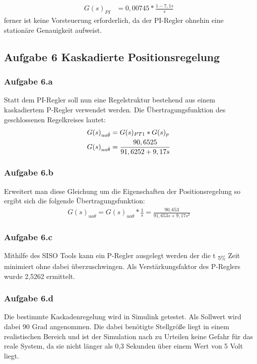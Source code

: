 \documentclass[10pt]{scrartcl}
\begin{document}
\begin{align}
G(s)_{PI}&=0,00745*\frac{1-7,1s}{s}
\end{align}
 ferner ist keine Vorsteuerung erforderlich, da der PI-Regler ohnehin eine stationäre Genauigkeit aufweist. \\


\subsection{Aufgabe 6 Kaskadierte Positionsregelung}
\subsubsection{Aufgabe 6.a}	
Statt dem PI-Regler soll nun eine Regelstruktur bestehend aus einem kaskadiertem P-Regler verwendet werden. Die Übertragungsfunktion des geschlossenen Regelkreises lautet:
\begin{align}
G(s)_{ua\dot{\theta}}&=G(s)_{PT1}*G(s)_{p} \notag \\
   G(s)_{ua\dot{\theta}}&=\frac{90,6525}{91,6252+9,17s}
\end{align} 
\subsubsection{Aufgabe 6.b}	
Erweitert man diese Gleichung um die Eigenschaften der Positionsregelung so ergibt sich die folgende Übertragungsfunktion:
\begin{align}
G(s)_{ ua\theta}=G(s)_{ua\dot{\theta}}*\frac{1}{s} = \frac{90,653}{91,653s+9,17s^2}
\end{align}
\subsubsection{Aufgabe 6.c}	
Mithilfe des SISO Tools kann ein P-Regler ausgelegt werden der die t \textsubscript{5\%} Zeit minimiert ohne dabei überzuschwingen. 
Als Verstärkungsfaktor des P-Reglers wurde 2,5262 ermittelt.
\subsubsection{Aufgabe 6.d}	
Die bestimmte Kaskadenregelung wird in Simulink getestet. Als Sollwert wird dabei 90 Grad angenommen. Die dabei benötigte Stellgröße liegt in einem realistischen Bereich und ist der Simulation nach zu Urteilen keine Gefahr für das reale System, da sie nicht länger als 0,3 Sekunden über einem Wert von 5 Volt liegt.\\
\end{document}

